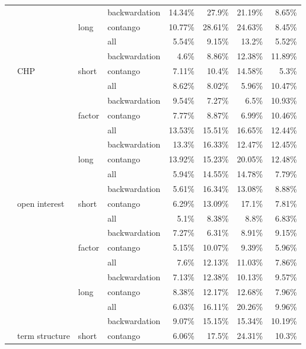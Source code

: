 \documentclass[]{elsarticle} %
\begin{document}
\begin{longtable}[t]{>{}llllrrrr}
\nopagebreak
 &  &  & backwardation & 14.34\% & 27.9\% & 21.19\% & 8.65\%\\
\nopagebreak
 &  & \multirow[t]{-3}{*}{\raggedright\arraybackslash long} & contango & 10.77\% & 28.61\% & 24.63\% & 8.45\%\\
\nopagebreak
 &  &  & all & 5.54\% & 9.15\% & 13.2\% & 5.52\%\\
\nopagebreak
 &  &  & backwardation & 4.6\% & 8.86\% & 12.38\% & 11.89\%\\
\nopagebreak
 & \multirow[t]{-9}{*}{\raggedright\arraybackslash CHP} & \multirow[t]{-3}{*}{\raggedright\arraybackslash short} & contango & 7.11\% & 10.4\% & 14.58\% & 5.3\%\\
\nopagebreak
 &  &  & all & 8.62\% & 8.02\% & 5.96\% & 10.47\%\\
\nopagebreak
 &  &  & backwardation & 9.54\% & 7.27\% & 6.5\% & 10.93\%\\
\nopagebreak
 &  & \multirow[t]{-3}{*}{\raggedright\arraybackslash factor} & contango & 7.77\% & 8.87\% & 6.99\% & 10.46\%\\
\nopagebreak
 &  &  & all & 13.53\% & 15.51\% & 16.65\% & 12.44\%\\
\nopagebreak
 &  &  & backwardation & 13.3\% & 16.33\% & 12.47\% & 12.45\%\\
\nopagebreak
 &  & \multirow[t]{-3}{*}{\raggedright\arraybackslash long} & contango & 13.92\% & 15.23\% & 20.05\% & 12.48\%\\
\nopagebreak
 &  &  & all & 5.94\% & 14.55\% & 14.78\% & 7.79\%\\
\nopagebreak
 &  &  & backwardation & 5.61\% & 16.34\% & 13.08\% & 8.88\%\\
\nopagebreak
 & \multirow[t]{-9}{*}{\raggedright\arraybackslash open interest} & \multirow[t]{-3}{*}{\raggedright\arraybackslash short} & contango & 6.29\% & 13.09\% & 17.1\% & 7.81\%\\
\nopagebreak
 &  &  & all & 5.1\% & 8.38\% & 8.8\% & 6.83\%\\
\nopagebreak
 &  &  & backwardation & 7.27\% & 6.31\% & 8.91\% & 9.15\%\\
\nopagebreak
 &  & \multirow[t]{-3}{*}{\raggedright\arraybackslash factor} & contango & 5.15\% & 10.07\% & 9.39\% & 5.96\%\\
\nopagebreak
 &  &  & all & 7.6\% & 12.13\% & 11.03\% & 7.86\%\\
\nopagebreak
 &  &  & backwardation & 7.13\% & 12.38\% & 10.13\% & 9.57\%\\
\nopagebreak
 &  & \multirow[t]{-3}{*}{\raggedright\arraybackslash long} & contango & 8.38\% & 12.17\% & 12.68\% & 7.96\%\\
\nopagebreak
 &  &  & all & 6.03\% & 16.11\% & 20.26\% & 9.96\%\\
\nopagebreak
 &  &  & backwardation & 9.07\% & 15.15\% & 15.34\% & 10.19\%\\
\nopagebreak
\multirow[t]{-30}{*}{\raggedright\arraybackslash \textbf{term structure}} & \multirow[t]{-9}{*}{\raggedright\arraybackslash term structure} & \multirow[t]{-3}{*}{\raggedright\arraybackslash short} & contango & 6.06\% & 17.5\% & 24.31\% & 10.3\%\\*
\end{longtable}
\endgroup{}
\end{document}
